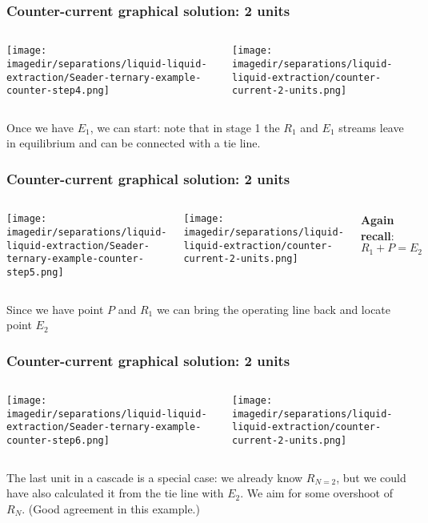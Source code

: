 \begin{frame}\frametitle{Counter-current graphical solution: 2 units}
	\begin{columns}[t]
			\begin{center}
				\texttt{[image: \\imagedir/separations/liquid-liquid-extraction/Seader-ternary-example-counter-step4.png]}
			\end{center}
			\begin{center}
				\texttt{[image: \\imagedir/separations/liquid-liquid-extraction/counter-current-2-units.png]}
			\end{center}
	\end{columns}
	\vspace{12pt}
	Once we have $E_1$, we can start: note that in stage 1 the $R_1$ and $E_1$ streams leave in equilibrium and can be connected with a tie line.
	\vfill
\end{frame}

\begin{frame}\frametitle{Counter-current graphical solution: 2 units}
	\begin{columns}[t]
			\begin{center}
				\texttt{[image: \\imagedir/separations/liquid-liquid-extraction/Seader-ternary-example-counter-step5.png]}
			\end{center}
			\begin{center}
				\texttt{[image: \\imagedir/separations/liquid-liquid-extraction/counter-current-2-units.png]}
			\end{center}
			\textbf{Again recall}: 
			\vspace{-12pt}
			\[	R_1 + P = E_2 \]
	\end{columns}
	\vspace{12pt}
	Since we have point $P$ and $R_1$ we can bring the operating line back and locate point $E_2$
	\vfill
\end{frame}

\begin{frame}\frametitle{Counter-current graphical solution: 2 units}
	\begin{columns}[t]
			\begin{center}
				\texttt{[image: \\imagedir/separations/liquid-liquid-extraction/Seader-ternary-example-counter-step6.png]}
			\end{center}
			\begin{center}
				\texttt{[image: \\imagedir/separations/liquid-liquid-extraction/counter-current-2-units.png]}
			\end{center}
	\end{columns}
	\vspace{12pt}
	The last unit in a cascade is a special case: we already know $R_{N=2}$, but we could have also calculated it from the tie line with $E_2$. We aim for some overshoot of $R_N$. {\scriptsize (Good agreement in this example.)}
\end{frame}

